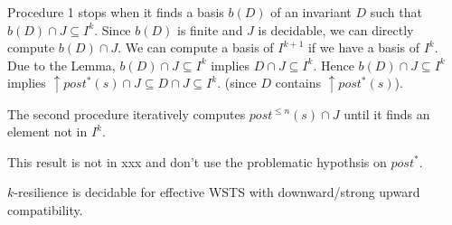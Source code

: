 Procedure 1 stops when it finds a basis $b(D)$ of an invariant $D$ such that
$b(D)  \cap J \subseteq I^k$.  Since $b(D)$ is finite and $J$ is decidable, we can
directly compute $b(D)  \cap J$.
We can compute a basis
of $I^{k+1}$ if we have a basis of $I^k$. %
Due to the Lemma, 
$b(D)  \cap J \subseteq I^k$ implies
$D  \cap J \subseteq I^k$.
Hence
$b(D)  \cap J \subseteq I^k$ implies
$\uparrow post^*(s) \cap J \subseteq D  \cap J \subseteq I^k$.
(since $D$ contains $ \uparrow post^*(s)$).



The second procedure iteratively computes
$post^{\leq n}(s) \cap J$
until it finds an element
not in $ I^k$.


This result is not in xxx and don't use the problematic hypothsis on $post^*$.

\begin{theorem}
{\sc $k$-resilience} is decidable for effective WSTS with downward/strong upward compatibility.
\end{theorem}


